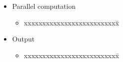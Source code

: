 \begin{frame}[fragile,label=ss-parameters]
\begin{minipage}[t]{1.7in}
\begin{itemize}
\begin{itemize}
\begin{tabbing}
   \end{tabbing}
\pause
  \item \begin{tabbing}
xxxxxxxxxxxxxxxxxxxxxxxxxx\=\kill
 \textcolor{green!50!black}{} \> 
   \end{tabbing}
  \end{itemize}
\pause
\item \textcolor{red!50!black}{Parallel computation}
  \begin{itemize}
\pause
  \item \begin{tabbing}
xxxxxxxxxxxxxxxxxxxxxxxxxx\=\kill
 \textcolor{red!50!black}{} \> 
  \end{tabbing}
  \end{itemize}
\pause
\item \textcolor{cyan!50!black}{Output}
  \begin{itemize}
\pause
    \item \begin{tabbing}
xxxxxxxxxxxxxxxxxxxxxxxxxx\=\kill
 \textcolor{cyan!50!black}{} \> 
    \end{tabbing}
  \end{itemize}
\end{itemize}
\end{minipage}
\end{frame}


